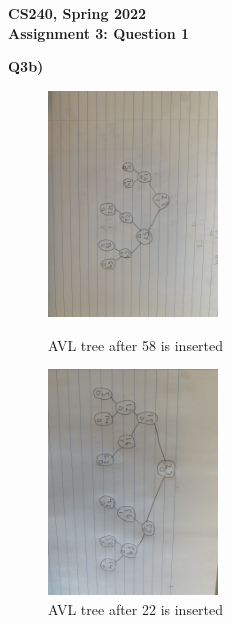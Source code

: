 \documentclass[12pt]{article}
\begin{document}
\begin{center}
{\Large\textbf{CS240, Spring 2022}}\\
\vspace{2mm}
{\Large\textbf{Assignment 3: Question 1}}\\
\vspace{3mm}
\end{center}
\begin{adjustwidth}{0em}{0pt}
\textbf{Q3b)} 
\begin{figure}[tbhp]
	\begin{center}
		\includegraphics[width=0.4\textwidth, angle=90]{1st.jpg}
	\end{center}
	\caption{AVL tree after 58 is inserted}
	\label{figcaption}
	\begin{center}
		\includegraphics[width=0.4\textwidth, angle=90]{2nd.jpg}
	\end{center}
	\caption{AVL tree after 22 is inserted}
	\label{figcaption}
\end{figure}
\end{adjustwidth} 
\newpage
\end{document}

